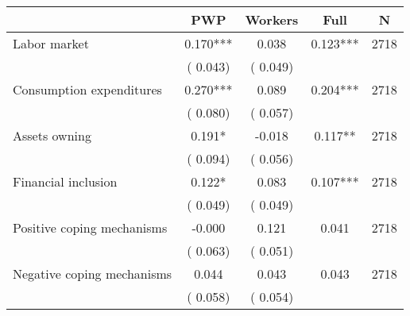 
\begin{tabular}{l*{4}{c}}\hline&\multicolumn{1}{c}{PWP}&\multicolumn{1}{c}{Workers}&\multicolumn{1}{c}{Full}&\multicolumn{1}{c}{N} \\ \hline

 Labor market &              0.170*** &         0.038 &           0.123*** & 2718                       \\  
                 &        (       0.043)                   &        (       0.049)                        &                                                             &                                                      \\      

 Consumption expenditures &              0.270*** &         0.089 &           0.204*** & 2718                       \\  
                 &        (       0.080)                   &        (       0.057)                        &                                                             &                                                      \\      

 Assets owning &              0.191* &        -0.018 &           0.117** & 2718                       \\  
                 &        (       0.094)                   &        (       0.056)                        &                                                             &                                                      \\      

 Financial inclusion &              0.122* &         0.083 &           0.107*** & 2718                       \\  
                 &        (       0.049)                   &        (       0.049)                        &                                                             &                                                      \\      

 Positive coping mechanisms &             -0.000 &         0.121 &           0.041 & 2718                       \\  
                 &        (       0.063)                   &        (       0.051)                        &                                                             &                                                      \\      

 Negative coping mechanisms &              0.044 &         0.043 &           0.043 & 2718                       \\  
                 &        (       0.058)                   &        (       0.054)                        &                                                             &                                                      \\      


\end{tabular}
